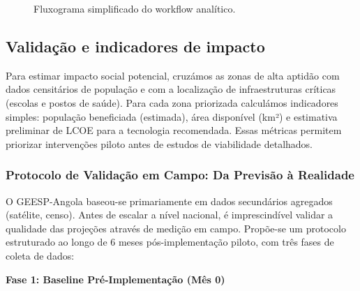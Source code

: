 \documentclass[12pt, a4paper]{article}
\begin{document}
{{{{{{{{{{{{\begin{figure}[H]
\caption{Fluxograma simplificado do workflow analítico.}
\label{fig:fluxograma}
\end{figure}

\subsection{Validação e indicadores de impacto}

Para estimar impacto social potencial, cruzámos as zonas de alta aptidão com dados censitários de população e com a localização de infraestruturas críticas (escolas e postos de saúde). Para cada zona priorizada calculámos indicadores simples: população beneficiada (estimada), área disponível (km²) e estimativa preliminar de LCOE para a tecnologia recomendada. Essas métricas permitem priorizar intervenções piloto antes de estudos de viabilidade detalhados.

\subsubsection{Protocolo de Validação em Campo: Da Previsão à Realidade}

O GEESP-Angola baseou-se primariamente em dados secundários agregados (satélite, censo). 
Antes de escalar a nível nacional, é imprescindível validar a qualidade das projeções 
através de medição em campo. Propõe-se um protocolo estruturado ao longo de 6 meses 
pós-implementação piloto, com três fases de coleta de dados:

\textbf{Fase 1: Baseline Pré-Implementação (Mês 0)}

}}}}}}}}}}}}
\end{document}
